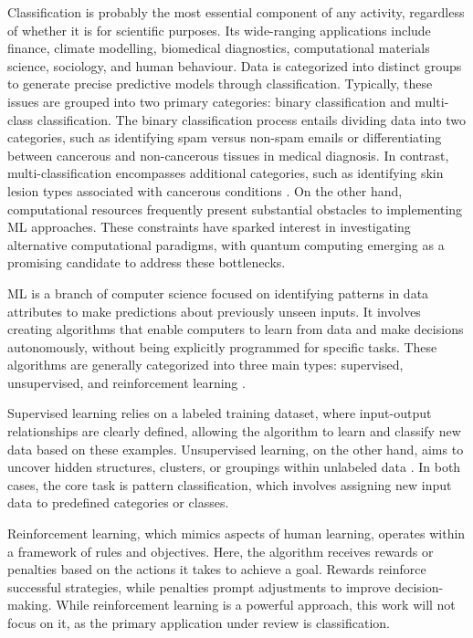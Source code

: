 \documentclass{article}
\begin{document}
Classification is probably the most essential component of any activity, regardless of whether it is for scientific purposes. Its wide-ranging applications include finance, climate modelling, biomedical diagnostics, computational materials science, sociology, and human behaviour. Data is categorized into distinct groups to generate precise predictive models through classification. Typically, these issues are grouped into two primary categories: binary classification and multi-class classification. The binary classification process entails dividing data into two categories, such as identifying spam versus non-spam emails or differentiating between cancerous and non-cancerous tissues in medical diagnosis.
In contrast, multi-classification encompasses additional categories, such as identifying skin lesion types associated with cancerous conditions \cite{10613907skin}. On the other hand, computational resources frequently present substantial obstacles to implementing ML approaches. These constraints have sparked interest in investigating alternative computational paradigms, with quantum computing emerging as a promising candidate to address these bottlenecks.

ML is a branch of computer science focused on identifying patterns in data attributes to make predictions about previously unseen inputs. It involves creating algorithms that enable computers to learn from data and make decisions autonomously, without being explicitly programmed for specific tasks. These algorithms are generally categorized into three main types: supervised, unsupervised, and reinforcement learning \cite{Ayodele10}.

Supervised learning relies on a labeled training dataset, where input-output relationships are clearly defined, allowing the algorithm to learn and classify new data based on these examples. Unsupervised learning, on the other hand, aims to uncover hidden structures, clusters, or groupings within unlabeled data \cite{10047618}. In both cases, the core task is pattern classification, which involves assigning new input data to predefined categories or classes.

Reinforcement learning, which mimics aspects of human learning, operates within a framework of rules and objectives. Here, the algorithm receives rewards or penalties based on the actions it takes to achieve a goal. Rewards reinforce successful strategies, while penalties prompt adjustments to improve decision-making. While reinforcement learning is a powerful approach, this work will not focus on it, as the primary application under review is classification.
\end{document}
